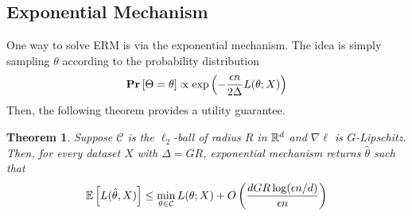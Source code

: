 \documentclass[11pt, a4paper]{article}
\newtheorem{theorem}{Theorem}
\newcommand{\E}[1]{\mathify{\mathbb{E}\left[#1\right]}}
\begin{document}
\subsection{Exponential Mechanism}
One way to solve ERM is via the exponential mechanism.
The idea is simply sampling $\theta$ according to the probability distribution
\begin{align}
    \Prob{\Theta=\theta}\propto \exp\left(-\frac{\epsilon n}{2\Delta}L(\theta; X)\right)
\end{align}
Then, the following theorem provides a utility guarantee.
\begin{theorem}
    Suppose $\mathcal{C}$ is the $\ell_2$-ball of radius $R$ in $\mathbb{R}^d$ and $\nabla\ell$ is $G$-Lipschitz.
    Then, for every dataset $X$ with $\Delta=GR$, exponential mechanism returns $\hat{\theta}$ such that
    \begin{align}
        \E{L(\hat{\theta}, X)} \leq \min_{\theta\in \mathcal{C}} L(\theta; X) 
            + O\left(\frac{dGR\log(\epsilon n/d)}{\epsilon n}\right)
    \end{align}
\end{theorem}
\end{document}
